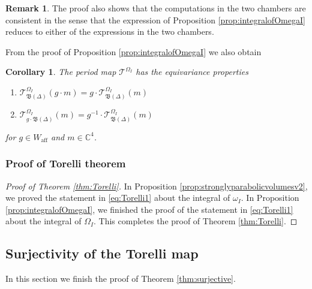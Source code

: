 \documentclass[12pt,letterpaper,reqno]{amsart}
\def\mathbf#1{#1}%
\newtheorem{cor}[thm]{Corollary}
\theoremstyle{remark}
\theoremstyle{definition}
\newtheorem{rem}[thm]{Remark}
\numberwithin{thm}{section}
\numberwithin{equation}{section}
\numberwithin{figure}{section}
\newcommand{\C}{\ensuremath{\mathbb C}}
\newcommand{\aff}{\mathrm{aff}}
\newcommand{\bfm}{\mathbf{m}}
\begin{document}
\begin{rem}
The proof also shows that the computations in the two chambers are consistent in the sense that the expression of Proposition \ref{prop:integralofOmegaI} reduces to either of the expressions in the two chambers.
\end{rem}

From the proof of Proposition \ref{prop:integralofOmegaI} we also obtain
\begin{cor}
The period map $\mathcal{T}^{\Omega_I}$ has the equivariance properties 
\begin{enumerate}


\item $\mathcal{T}_{\mathfrak{B}(\Delta)}^{\Omega_I}(g \cdot \bfm) = g \cdot \mathcal{T}_{\mathfrak{B}(\Delta)}^{\Omega_I}(\bfm)$ 
\smallskip
\item $\mathcal{T}_{g \cdot \mathfrak{B}(\Delta)}^{\Omega_I}(\bfm) = g^{-1} \cdot \mathcal{T}_{\mathfrak{B}(\Delta)}^{\Omega_I}(\bfm)$
\end{enumerate}
for $g \in W_\aff$ and $\bfm \in \C^4$.

\end{cor}

\subsubsection{Proof of Torelli theorem}


\begin{proof}[Proof of Theorem \ref{thm:Torelli}]
In Proposition \ref{prop:stronglyparabolicvolumesv2}, we proved the statement in \eqref{eq:Torelli1} about the integral of $\omega_I$. In Proposition \ref{prop:integralofOmegaI}, we finished the proof of the statement in \eqref{eq:Torelli1} about the integral of $\Omega_I$.
This completes the proof of Theorem \ref{thm:Torelli}.
\end{proof}


\subsection{Surjectivity of the Torelli map}  \label{sec:Torelliproof}


In this section we finish the proof of Theorem \ref{thm:surjective}.

\medskip
\end{document}
